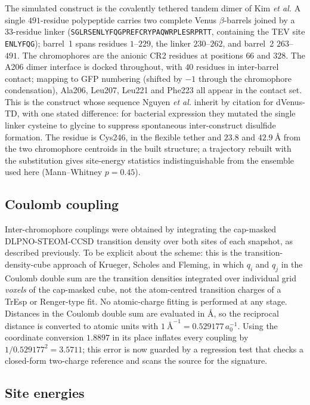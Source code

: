 \documentclass[journal=jpcbfk, manuscript=article, layout=twocolumn, doi=true]{achemso}
\begin{document}
The simulated construct is the covalently tethered tandem dimer of Kim
\emph{et al.}\cite{kim2019venusa206} A single $491$-residue polypeptide carries
two complete Venus $\beta$-barrels joined by a $33$-residue linker
(\texttt{SGLRSENLYFQGPREFCRYPAQWRPLESRPRTT}, containing the TEV site
\texttt{ENLYFQG}); barrel~1 spans residues $1$--$229$, the linker $230$--$262$,
and barrel~2 $263$--$491$. The chromophores are the anionic CR2 residues at
positions $66$ and $328$. The A206 dimer interface is docked throughout, with
$40$ residues in inter-barrel contact; mapping to GFP numbering (shifted by
$-1$ through the chromophore condensation), Ala206, Leu207, Leu221 and Phe223
all appear in the contact set. This is the construct whose sequence Nguyen
\emph{et al.} inherit by citation for dVenus-TD, with one stated difference:
for bacterial expression they mutated the single linker cysteine to glycine to
suppress spontaneous inter-construct disulfide
formation.\cite{nguyen2025anomalous} The residue is Cys246, in the flexible
tether and $23.8$ and $42.9~\text{\AA}$ from the two chromophore centroids in
the built structure; a trajectory rebuilt with the substitution gives
site-energy statistics indistinguishable from the ensemble used here
(Mann--Whitney $p = 0.45$).

\subsection{Coulomb coupling}

Inter-chromophore couplings were obtained by integrating the cap-masked
DLPNO-STEOM-CCSD transition density over both sites of each snapshot, as
described previously. To be explicit about the scheme: this is the
transition-density-cube approach of Krueger, Scholes and
Fleming,\cite{krueger1998} in which $q_i$ and $q_j$ in the Coulomb double sum
are the transition densities integrated over individual grid \emph{voxels} of
the cap-masked cube, not the atom-centred transition charges of a TrEsp or
Renger-type fit.\cite{madjet2006tresp} No atomic-charge fitting is performed at any
stage. Distances in the Coulomb double sum are evaluated in
\AA{}, so the reciprocal distance is converted to atomic units with
$1~\text{\AA}^{-1} = 0.529177\,a_{0}^{-1}$. Using the coordinate conversion
$1.8897$ in its place inflates every coupling by
$1/0.529177^{2} = 3.5711$; this error is now guarded by a regression test that
checks a closed-form two-charge reference and scans the source for the
signature.

\subsection{Site energies}
\end{document}
